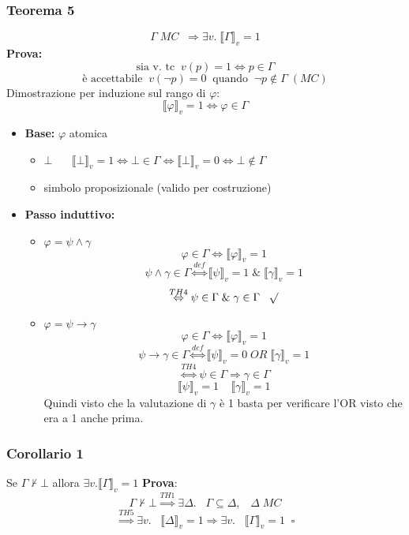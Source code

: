 \documentclass{article}
\theoremstyle{break}
\theoremstyle{break}
\theoremstyle{break}
\theoremstyle{break}
\begin{document}
\subsubsection{Teorema 5}
\[
  \Gamma\;MC\;\; \Rightarrow \exists v.\; \llbracket \Gamma\rrbracket_v=1
\] 
\textbf{Prova:}
\[
  \text{sia v. tc}\;\; v(p)=1 \Leftrightarrow p \in \Gamma
\] 
\[
  \text{è accettabile}\;\;v(\neg p) = 0 \;\;\text{quando}\;\; \neg p \notin \Gamma\;(MC)
\] 
Dimostrazione per induzione sul rango di \( \varphi \):
\[
  \llbracket \varphi\rrbracket_v = 1 \Leftrightarrow \varphi \in \Gamma
\] 
\begin{itemize}
  \item \textbf{Base:} \( \varphi \) atomica
    \begin{itemize}
      \item \( \bot\;\;\;\;\; \) 
        \(
        \llbracket \bot\rrbracket_v = 1 \Leftrightarrow \bot \in \Gamma \Leftrightarrow \llbracket \bot\rrbracket_v=0 \Leftrightarrow \bot \notin \Gamma
        \) 
      \item simbolo proposizionale (valido per costruzione)
    \end{itemize} 
  \item \textbf{Passo induttivo:} 
    \begin{itemize}
      \item \( \varphi = \psi \wedge \gamma\) 
        \[
          \varphi \in \Gamma \Leftrightarrow \llbracket \varphi\rrbracket_v=1
        \] 
        \[
          \psi \wedge \gamma \in \Gamma \stackrel{def}{\Leftrightarrow} \llbracket \psi\rrbracket_v=1\;\&\; \llbracket \gamma\rrbracket_v=1
        \] 
        \[
          \stackrel{TH4}{\Leftrightarrow} \psi \in \Gamma\; \& \; \gamma \in \Gamma\;\;\; \surd
        \] 
      \item \( \varphi = \psi \to \gamma\)
        \[
          \varphi \in \Gamma \Leftrightarrow \llbracket \varphi\rrbracket_v=1
        \] 
        \[
          \psi \to \gamma \in \Gamma \stackrel{def}{\Leftrightarrow} \llbracket \psi\rrbracket_v=0 \; OR\; \llbracket \gamma\rrbracket_v=1
        \] 
        \[
          \stackrel{TH4}{\Leftrightarrow} \psi \in \Gamma \Rightarrow \gamma \in \Gamma
        \] 
        \[
          \llbracket \psi\rrbracket_v=1\;\;\;\;\llbracket \gamma\rrbracket_v=1
        \] 
        Quindi visto che la valutazione di \( \gamma \) è 1 basta per verificare
        l'OR visto che era a 1 anche prima.
    \end{itemize}
\end{itemize}
\subsubsection{Corollario 1}
Se \( \Gamma \not\vdash \bot \) allora \( \exists v. \llbracket \Gamma\rrbracket_v=1 \) 
\textbf{Prova}:
\[
  \Gamma \not\vdash \bot \stackrel{TH1}{\Rightarrow} \exists \Delta.\;\;\; \Gamma \subseteq \Delta,\;\;\; \Delta\; MC
\] 
\[
  \stackrel{TH5}{\Rightarrow} \exists v.\;\;\; \llbracket \Delta\rrbracket_v=1 \Rightarrow \exists v.\;\;\; \llbracket \Gamma\rrbracket_v=1 \;\; \square
\] 
\end{document}
